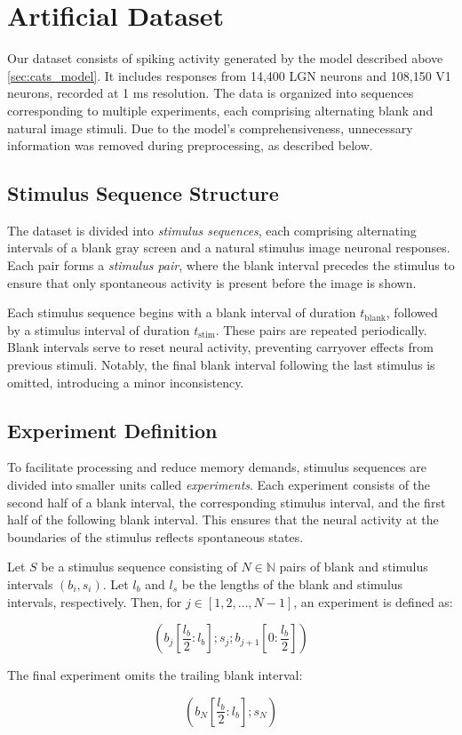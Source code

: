 \section{Artificial Dataset}
\label{sec:artificial_dataset}
Our dataset consists of spiking activity generated by the model described above \ref{sec:cats_model}. It includes responses from 14,400 LGN neurons and 108,150 V1 neurons, recorded at 1 ms resolution. The data is organized into sequences corresponding to multiple experiments, each comprising alternating blank and natural image stimuli. Due to the model's comprehensiveness, unnecessary information was removed during preprocessing, as described below.

\subsection{Stimulus Sequence Structure}
\label{subsec:stimulus_sequence}
The dataset is divided into \emph{stimulus sequences}, each comprising alternating intervals of a blank gray screen and a natural stimulus image neuronal responses. Each pair forms a \emph{stimulus pair}, where the blank interval precedes the stimulus to ensure that only spontaneous activity is present before the image is shown.

Each stimulus sequence begins with a blank interval of duration $t_{\text{blank}}$, followed by a stimulus interval of duration $t_{\text{stim}}$. These pairs are repeated periodically. Blank intervals serve to reset neural activity, preventing carryover effects from previous stimuli. Notably, the final blank interval following the last stimulus is omitted, introducing a minor inconsistency.

\subsection{Experiment Definition}
\label{subsec:experiment}
To facilitate processing and reduce memory demands, stimulus sequences are divided into smaller units called \emph{experiments}. Each experiment consists of the second half of a blank interval, the corresponding stimulus interval, and the first half of the following blank interval. This ensures that the neural activity at the boundaries of the stimulus reflects spontaneous states.

\begin{defn}[Experiment]
    Let $S$ be a stimulus sequence consisting of $N \in \mathbb{N}$ pairs of blank and stimulus intervals $(b_i, s_i)$. Let $l_b$ and $l_s$ be the lengths of the blank and stimulus intervals, respectively. Then, for $j \in [1, 2, \dots, N-1]$, an experiment is defined as:

    $$
    \left(b_j\left[\frac{l_b}{2}:l_b\right]; s_j; b_{j+1}\left[0:\frac{l_b}{2}\right]\right)
    $$

    The final experiment omits the trailing blank interval:

    $$
    \left(b_N\left[\frac{l_b}{2}:l_b\right]; s_N\right)
    $$
\end{defn}
\label{def:experiment}

